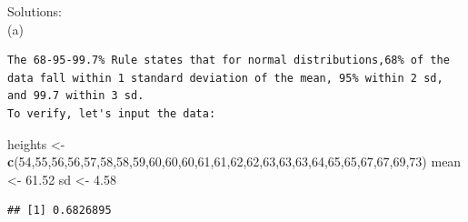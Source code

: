 \documentclass[]{article}
\newenvironment{Shaded}{\begin{snugshade}}{\end{snugshade}}
\newcommand{\KeywordTok}[1]{\textcolor[rgb]{0.13,0.29,0.53}{\textbf{{#1}}}}
\newcommand{\DecValTok}[1]{\textcolor[rgb]{0.00,0.00,0.81}{{#1}}}
\newcommand{\FloatTok}[1]{\textcolor[rgb]{0.00,0.00,0.81}{{#1}}}
\newcommand{\StringTok}[1]{\textcolor[rgb]{0.31,0.60,0.02}{{#1}}}
\newcommand{\CommentTok}[1]{\textcolor[rgb]{0.56,0.35,0.01}{\textit{{#1}}}}
\newcommand{\NormalTok}[1]{{#1}}
\begin{document}
Solutions:\\
(a)

\begin{verbatim}
The 68-95-99.7% Rule states that for normal distributions,68% of the data fall within 1 standard deviation of the mean, 95% within 2 sd, and 99.7 within 3 sd.
To verify, let's input the data:
\end{verbatim}

\begin{Shaded}
\begin{Highlighting}[]
\NormalTok{heights <-}\StringTok{ }\KeywordTok{c}\NormalTok{(}\DecValTok{54}\NormalTok{,}\DecValTok{55}\NormalTok{,}\DecValTok{56}\NormalTok{,}\DecValTok{56}\NormalTok{,}\DecValTok{57}\NormalTok{,}\DecValTok{58}\NormalTok{,}\DecValTok{58}\NormalTok{,}\DecValTok{59}\NormalTok{,}\DecValTok{60}\NormalTok{,}\DecValTok{60}\NormalTok{,}\DecValTok{60}\NormalTok{,}\DecValTok{61}\NormalTok{,}\DecValTok{61}\NormalTok{,}\DecValTok{62}\NormalTok{,}\DecValTok{62}\NormalTok{,}\DecValTok{63}\NormalTok{,}\DecValTok{63}\NormalTok{,}\DecValTok{63}\NormalTok{,}\DecValTok{64}\NormalTok{,}\DecValTok{65}\NormalTok{,}\DecValTok{65}\NormalTok{,}\DecValTok{67}\NormalTok{,}\DecValTok{67}\NormalTok{,}\DecValTok{69}\NormalTok{,}\DecValTok{73}\NormalTok{)}
\NormalTok{mean <-}\StringTok{ }\FloatTok{61.52}
\NormalTok{sd <-}\StringTok{ }\FloatTok{4.58}
\end{Highlighting}
\end{Shaded}

\begin{Shaded}
\end{Shaded}

\begin{verbatim}
## [1] 0.6826895
\end{verbatim}

\begin{Shaded}
\end{Shaded}
\end{document}
